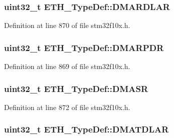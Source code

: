 \subsubsection[{\texorpdfstring{D\+M\+A\+R\+D\+L\+AR}{DMARDLAR}}]{ {\bf uint32\+\_\+t} E\+T\+H\+\_\+\+Type\+Def\+::\+D\+M\+A\+R\+D\+L\+AR}\hypertarget{struct_e_t_h___type_def_a46aafb9acbd753c23f89a9f57b68b64f}{}\label{struct_e_t_h___type_def_a46aafb9acbd753c23f89a9f57b68b64f}


Definition at line 870 of file stm32f10x.\+h.

\subsubsection[{\texorpdfstring{D\+M\+A\+R\+P\+DR}{DMARPDR}}]{ {\bf uint32\+\_\+t} E\+T\+H\+\_\+\+Type\+Def\+::\+D\+M\+A\+R\+P\+DR}\hypertarget{struct_e_t_h___type_def_aedb2e74c294ffed25c952b17e5bc0fc4}{}\label{struct_e_t_h___type_def_aedb2e74c294ffed25c952b17e5bc0fc4}


Definition at line 869 of file stm32f10x.\+h.

\subsubsection[{\texorpdfstring{D\+M\+A\+SR}{DMASR}}]{ {\bf uint32\+\_\+t} E\+T\+H\+\_\+\+Type\+Def\+::\+D\+M\+A\+SR}\hypertarget{struct_e_t_h___type_def_aa55a721ec8bb2239012aa7202e75abef}{}\label{struct_e_t_h___type_def_aa55a721ec8bb2239012aa7202e75abef}


Definition at line 872 of file stm32f10x.\+h.

\subsubsection[{\texorpdfstring{D\+M\+A\+T\+D\+L\+AR}{DMATDLAR}}]{ {\bf uint32\+\_\+t} E\+T\+H\+\_\+\+Type\+Def\+::\+D\+M\+A\+T\+D\+L\+AR}\hypertarget{struct_e_t_h___type_def_a480a59fd0e4c6088a693fc8160831154}{}\label{struct_e_t_h___type_def_a480a59fd0e4c6088a693fc8160831154}


